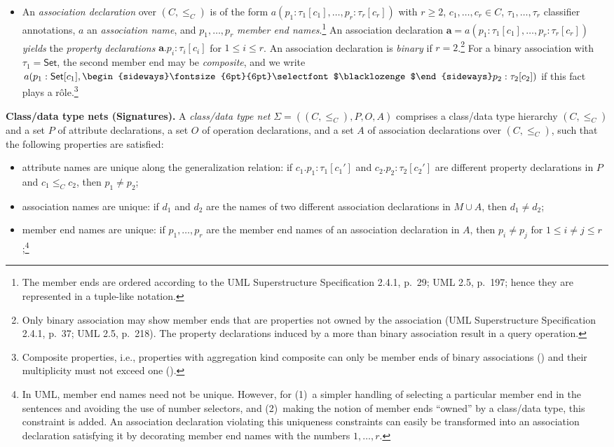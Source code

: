 \documentclass[10pt,fleqn,final]{scrreprt}
\newenvironment{definitions}[0]{\medskip }{}
\newcommand{\uml}[1]{\textsf{#1}}
\newcommand{\composition}{\raisebox{0.2pt}{\begin{sideways}\fontsize{6pt}{6pt}\selectfont$\blacklozenge$\end{sideways}}}
\begin{document}
\begin{definitions}
\begin{itemize}[label={--}, leftmargin=*]
  \item An \emph{association declaration} over $(C, {\leq_C})$
is of the form $a(p_1 : \tau_1[c_1], \dots, p_r : \tau_r[c_r])$
with $r \geq 2$,
$c_1, \dots, c_r \in C$,
$\tau_1, \ldots, \tau_r$
classifier annotations, $a$
an \emph{association name}, and $p_1, \dots, p_r$
\emph{member end names}.\footnote{The member ends are ordered according
  to the UML Superstructure Specification 2.4.1, p.~29; UML 2.5, p.~197;
  hence they are represented in a tuple-like notation.}  An association
declaration
$\mathbf{a} = a(p_1 : \tau_1[c_1], \ldots, p_r : \tau_r[c_r])$
\emph{yields} the \emph{property declarations}
$\mathbf{a}.p_i : \tau_i[c_i]$
for $1 \leq i \leq r$.
An association declaration is \emph{binary} if $r = 2$.\footnote{Only
  binary association may show member ends that are properties not owned
  by the association (UML Superstructure Specification 2.4.1, p.~37; UML
  2.5, p.~218).  The property declarations induced by a more than binary
  association result in a query operation.}  For a binary association
with $\tau_1 = \mathsf{Set}$,
the second member end may be \emph{composite}, and we write
$a(p_1 : \mathsf{Set}[c_1], \composition p_2 : \tau_2[c_2])$
if this fact plays a rôle.\footnote{Composite properties, i.e.,
  properties with aggregation kind \uml{composite} can only be member
  ends of binary associations (\cite[p.~218]{uml-2.5}) and their
  multiplicity must not exceed one (\cite[p.~150]{uml-2.5}).}
\end{itemize}

\medskip\noindent\textbf{Class/data type nets (Signatures).}
A \emph{class/data type net} $\Sigma = ((C, {\leq_C}), P, O, A)$
comprises a class/data type hierarchy $(C, {\leq_C})$ and a set $P$ of
attribute declarations, a set $O$ of operation declarations,
 and a set $A$ of association declarations over
$(C, {\leq_C})$, such that
the following properties are satisfied:
%
\begin{itemize}[label={--}, leftmargin=*]
  \item attribute names are unique along the generalization relation: if
$c_1.p_1 : \tau_1[c_1']$ and $c_2.p_2 : \tau_2[c_2']$ are different
property declarations in $P$ and $c_1 \leq_C c_2$, then $p_1 \neq
p_2$;

  \item association names are unique: if $d_1$
and $d_2$
are the names of two different association declarations in $M \cup A$,
then $d_1 \neq d_2$;

  \item member end names are unique: if $p_1, \ldots, p_r$ are the
member end names of an association declaration in $A$, then $p_i \neq p_j$ for
$1 \leq i \neq j \leq r$;\footnote{In UML, member end names need not be
  unique.  However, for (1)~a simpler handling of selecting a particular
  member end in the sentences and avoiding the use of number selectors,
  and (2)~making the notion of member ends ``owned'' by a class/data
  type, this constraint is added. An association declaration violating this
  uniqueness constraints can easily be transformed into an association 
  declaration satisfying it by decorating member end names with the
  numbers $1,\ldots,r$.}


\end{itemize}
\end{definitions}
\end{document}
